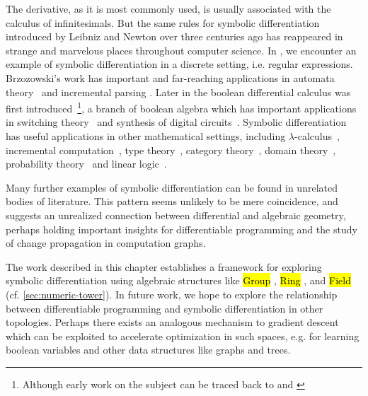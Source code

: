 \documentclass[12pt,initial,twoside,maitrise]{dms}
\newcommand{\inline}[1]{%
    \begingroup%
    \sethlcolor{slightgray}%
    \hl{\ttfamily\small #1}%
    \endgroup
}
\numberwithin{equation}{section}
\numberwithin{table}{chapter}
\numberwithin{figure}{chapter}
\begin{document}
The derivative, as it is most commonly used, is usually associated with the calculus of infinitesimals. But the same rules for symbolic differentiation introduced by Leibniz and Newton over three centuries ago has reappeared in strange and marvelous places throughout computer science. In \citet{brzozowski1964derivatives}, we encounter an example of symbolic differentiation in a discrete setting, i.e. regular expressions. Brzozowski's work has important and far-reaching applications in automata theory~\citep{berry1986regex, antimirov1996partial, champarnaud1999regular} and incremental parsing \citep{might2011parsing, moss2014derivatives}. Later in \citet{thayse1981boolean} the boolean differential calculus was first introduced~\footnote{Although early work on the subject can be traced back to \citet{talantsev1959analysis} and \citet{sellers1968analyzing}}, a branch of boolean algebra which has important applications in switching theory~\citep{thayse1973boolean} and synthesis of digital circuits~\citep{steinbach2017boolean}. Symbolic differentiation has useful applications in other mathematical settings, including $\lambda$-calculus~\citep{ehrhard2003differential, cai2014theory, kelly2016evolving, brunel2020backpropagation}, incremental computation~\citep{alvarez2019fixing, alvarez2019change}, type theory~\citep{mcbride2001derivative, mcbride2008clowns, chen2012type}, category theory~\citep{blute2006differential, blute2009cartesian}, domain theory~\citep{edalat2002domain}, probability theory~\citep{kac1951probability} and linear logic~\citep{ehrhard2018introduction, clift2018derivatives}.

Many further examples of symbolic differentiation can be found in unrelated bodies of literature. This pattern seems unlikely to be mere coincidence, and suggests an unrealized connection between differential and algebraic geometry, perhaps holding important insights for differentiable programming and the study of change propagation in computation graphs.

The work described in this chapter establishes a framework for exploring symbolic differentiation using algebraic structures like \inline{Group}, \inline{Ring}, and \inline{Field} (cf. \autoref{sec:numeric-tower}). In future work, we hope to explore the relationship between differentiable programming and symbolic differentiation in other topologies. Perhaps there exists an analogous mechanism to gradient descent which can be exploited to accelerate optimization in such spaces, e.g. for learning boolean variables and other data structures like graphs and trees.
\end{document}
